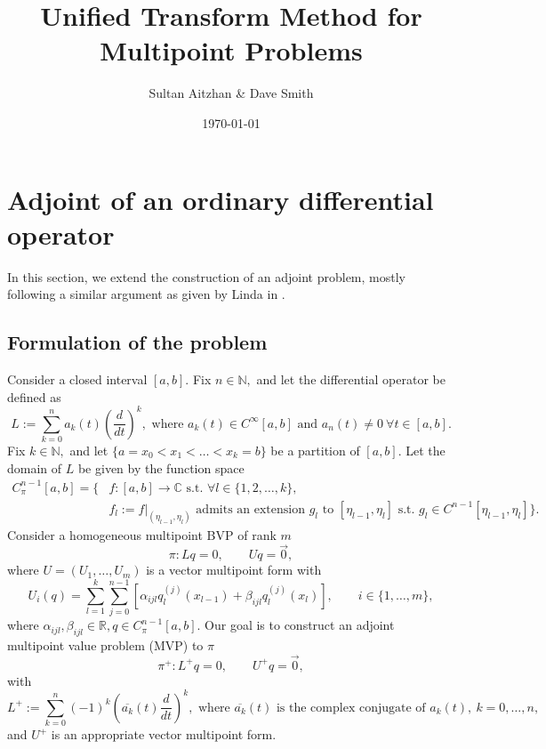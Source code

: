 \documentclass[10pt,reqno,oneside,a4paper]{article}
\author{Sultan Aitzhan \& Dave Smith}
\title{Unified Transform Method for Multipoint Problems}
\date{\today}
\begin{document}
\maketitle
\thispagestyle{fancy}

\section{Adjoint of an ordinary differential operator}

In this section, we extend the construction of an adjoint problem, mostly following a similar argument as given by Linda in \cite{linfan}.
\subsection{Formulation of the problem}
Consider a closed interval $[a,b].$ Fix $n\in\mathbb{N},$ and let the differential operator be defined as
\[ 
L  := \sum^n_{k=0} a_k(t)\left( \frac{d}{dt}\right)^k, \mbox{ where } a_k(t) \in C^{\infty}[a,b] \mbox{ and } a_n(t) \neq 0~ \forall t \in [a,b].
\]
Fix $k \in \mathbb{N},$ and let $\{ a = x_0 < x_1 < \ldots < x_k = b\}$ be a partition of $[a,b].$ Let the domain of $L$ be given by the function space
\begin{equation*}
\begin{aligned}
C^{n-1}_{\pi}[a,b] = \Big\{ &f: [a,b] \to \mathbb{C} \mbox{ s.t. } \forall l\in \{1, 2, \ldots, k \}, \\
&f_l := f\big\vert_{(\eta_{l-1}, \eta_l)} \mbox{ admits an extension } g_l \mbox{ to } [\eta_{l-1}, \eta_l] \mbox{ s.t. } g_l \in C^{n-1}[\eta_{l-1}, \eta_l] \Big\}.
\end{aligned}
\end{equation*}
Consider a homogeneous multipoint BVP of rank $m$
\[ \pi: Lq = 0, \qquad Uq = \vec{0},\]
where $U = (U_1, \ldots, U_m)$ is a vector multipoint form with 
\[ 
U_i(q) = \sum^{k}_{l=1} \sum^{n-1}_{j=0}[\alpha_{ijl} q_l^{(j)}(x_{l-1}) + \beta_{ijl} q_l^{(j)}(x_{l})], \qquad i \in \{ 1, \ldots, m \}, 
\]
where $\alpha_{ijl}, \beta_{ijl} \in \mathbb{R}, q \in C^{n-1}_{\pi}[a,b].$ Our goal is to construct an adjoint multipoint value problem (MVP) to $\pi$
\[ 
\pi^+: L^+ q = 0, \qquad U^+q = \vec{0},
\] 
with 
\[ 
L^+  := \sum^n_{k=0} (-1)^k \left(\overline{a_k}(t) \frac{d}{dt}\right)^k, \mbox{ where } \overline{a_k}(t) \mbox{ is the complex conjugate of } a_k(t), ~ k = 0, \ldots, n,
\]
and $U^+$ is an appropriate vector multipoint form.
\end{document}

